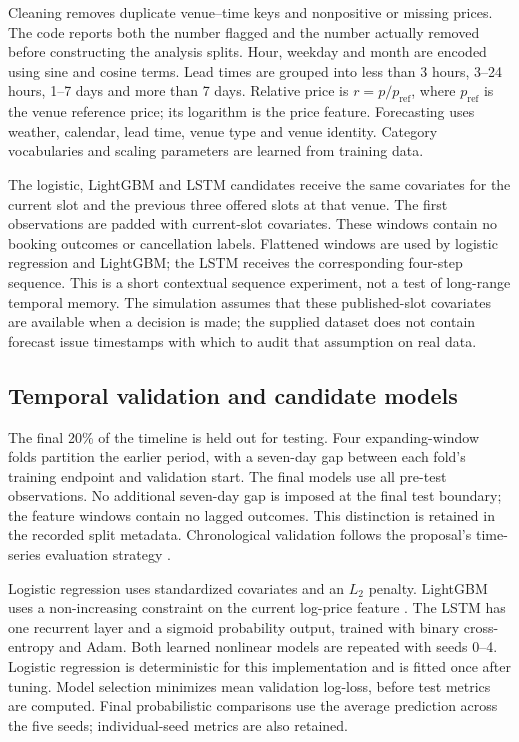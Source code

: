 Cleaning removes duplicate venue--time keys and nonpositive or missing prices. The code reports both the number flagged and the number actually removed before constructing the analysis splits. Hour, weekday and month are encoded using sine and cosine terms. Lead times are grouped into less than 3 hours, 3--24 hours, 1--7 days and more than 7 days. Relative price is $r=p/p_{\mathrm{ref}}$, where $p_{\mathrm{ref}}$ is the venue reference price; its logarithm is the price feature. Forecasting uses weather, calendar, lead time, venue type and venue identity. Category vocabularies and scaling parameters are learned from training data.

The logistic, LightGBM and LSTM candidates receive the same covariates for the current slot and the previous three offered slots at that venue. The first observations are padded with current-slot covariates. These windows contain no booking outcomes or cancellation labels. Flattened windows are used by logistic regression and LightGBM; the LSTM receives the corresponding four-step sequence. This is a short contextual sequence experiment, not a test of long-range temporal memory. The simulation assumes that these published-slot covariates are available when a decision is made; the supplied dataset does not contain forecast issue timestamps with which to audit that assumption on real data.

\subsection{Temporal validation and candidate models}
The final 20\% of the timeline is held out for testing. Four expanding-window folds partition the earlier period, with a seven-day gap between each fold's training endpoint and validation start. The final models use all pre-test observations. No additional seven-day gap is imposed at the final test boundary; the feature windows contain no lagged outcomes. This distinction is retained in the recorded split metadata. Chronological validation follows the proposal's time-series evaluation strategy \cite{m25}.

Logistic regression uses standardized covariates and an $L_2$ penalty. LightGBM uses a non-increasing constraint on the current log-price feature \cite{m27}. The LSTM has one recurrent layer and a sigmoid probability output, trained with binary cross-entropy and Adam. Both learned nonlinear models are repeated with seeds 0--4. Logistic regression is deterministic for this implementation and is fitted once after tuning. Model selection minimizes mean validation log-loss, before test metrics are computed. Final probabilistic comparisons use the average prediction across the five seeds; individual-seed metrics are also retained.

